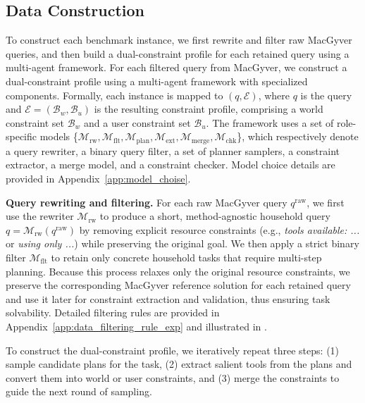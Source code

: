 \subsection{Data Construction}
\label{sec:data-construction}
To construct each benchmark instance, we first rewrite and filter raw MacGyver queries, and then build a dual-constraint profile for each retained query using a multi-agent framework.
For each filtered query from MacGyver, we construct a dual-constraint profile using a multi-agent framework with specialized components. Formally, each instance is mapped to $(q,\mathcal{E})$, where $q$ is the query and $\mathcal{E}=(\mathcal{B}_{w},\mathcal{B}_{u})$ is the resulting constraint profile, comprising a world constraint set $\mathcal{B}_{w}$ and a user constraint set $\mathcal{B}_{u}$. The framework uses a set of role-specific models \{${\mathcal{M}_{\mathrm{rw}}, \mathcal{M}_{\mathrm{flt}}, \mathcal{M}_{\mathrm{plan}}, \mathcal{M}_{\mathrm{ext}}, \mathcal{M}_{\mathrm{merge}}, \mathcal{M}_{\mathrm{chk}}}$\}, which respectively denote a query rewriter, a binary query filter, a set of planner samplers, a constraint extractor, a merge model, and a constraint checker. Model choice details are provided in Appendix~\ref{app:model_choise}.

\noindent\textbf{Query rewriting and filtering.}
For each raw MacGyver query $q^{\mathrm{raw}}$, we first use the rewriter $\mathcal{M}_{\mathrm{rw}}$ to produce a short, method-agnostic household query {\small $q=\mathcal{M}_{\mathrm{rw}}(q^{\mathrm{raw}})$} by removing explicit resource constraints (e.g., \textit{tools available: ...} or \textit{using only ...}) while preserving the original goal. We then apply a strict binary filter $\mathcal{M}_{\mathrm{flt}}$ to retain only concrete household tasks that require multi-step planning. 
Because this process relaxes only the original resource constraints, we preserve the corresponding MacGyver reference solution for each retained query and use it later for constraint extraction and validation, thus ensuring task solvability. 
Detailed filtering rules are provided in Appendix~\ref{app:data_filtering_rule_exp} and illustrated in .

To construct the dual-constraint profile, we iteratively repeat three steps: (1) sample candidate plans for the task, (2) extract salient tools from the plans and convert them into world or user constraints, and (3) merge the constraints to guide the next round of sampling.

